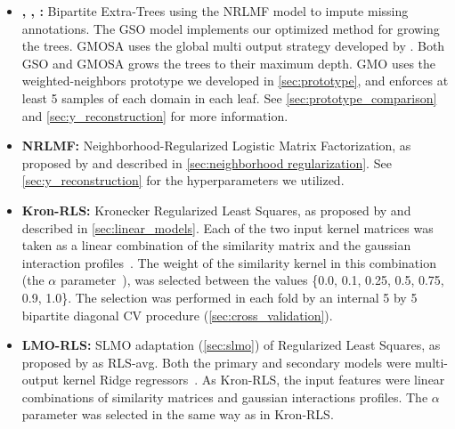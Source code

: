 \begin{itemize}
    \item \textbf{, , :} Bipartite Extra-Trees using the NRLMF model to impute missing annotations. The GSO model implements our optimized method for growing the trees. GMOSA uses the global multi output strategy developed by . Both GSO and GMOSA grows the trees to their maximum depth. GMO uses the weighted-neighbors prototype we developed in \autoref{sec:prototype}, and enforces at least 5 samples of each domain in each leaf. See \autoref{sec:prototype_comparison} and \autoref{sec:y_reconstruction} for more information.

    \item \textbf{NRLMF:} Neighborhood-Regularized Logistic Matrix Factorization, as proposed by  and described in \autoref{sec:neighborhood regularization}. See \autoref{sec:y_reconstruction} for the hyperparameters we utilized.

    \item \textbf{Kron-RLS:} Kronecker Regularized Least Squares, as proposed by  and described in \autoref{sec:linear_models}.
    Each of the two input kernel matrices was taken as a linear combination of the similarity matrix and the gaussian interaction profiles~\cite{vanlaarhoven2011gaussian}. %
    The weight of the similarity kernel in this combination (the $\alpha$ parameter~\cite{vanlaarhoven2011gaussian}), was selected between the values \{0.0, 0.1, 0.25, 0.5, 0.75, 0.9, 1.0\}.
    The selection was performed in each fold by an internal 5 by 5 bipartite diagonal CV procedure (\autoref{sec:cross_validation}).

    \item \textbf{LMO-RLS:} SLMO adaptation (\autoref{sec:slmo}) of Regularized Least Squares, as proposed by  as RLS-avg. Both the primary and secondary models were multi-output kernel Ridge regressors~\cite[p.~492-493]{murphy2012machine}. 
    As Kron-RLS, the input features were linear combinations of similarity matrices and gaussian interactions profiles. The $\alpha$ parameter was selected in the same way as in Kron-RLS.


\end{itemize}

